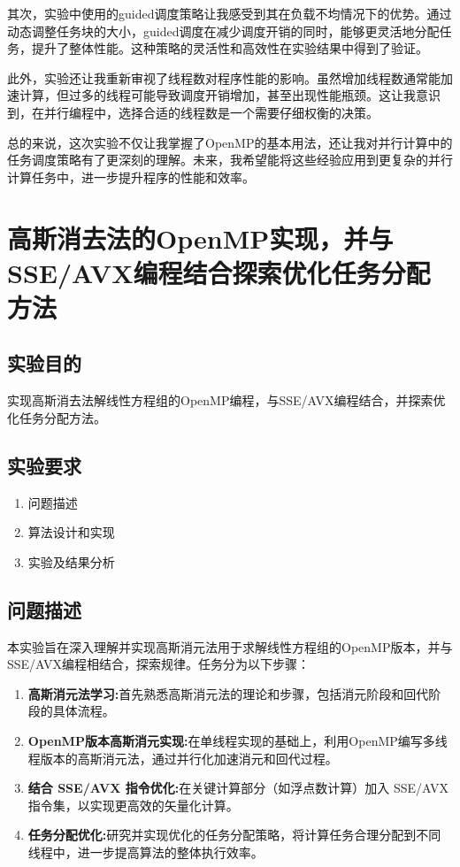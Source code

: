 \documentclass{nku}
\begin{document}
其次，实验中使用的guided调度策略让我感受到其在负载不均情况下的优势。通过动态调整任务块的大小，guided调度在减少调度开销的同时，能够更灵活地分配任务，提升了整体性能。这种策略的灵活性和高效性在实验结果中得到了验证。

此外，实验还让我重新审视了线程数对程序性能的影响。虽然增加线程数通常能加速计算，但过多的线程可能导致调度开销增加，甚至出现性能瓶颈。这让我意识到，在并行编程中，选择合适的线程数是一个需要仔细权衡的决策。

总的来说，这次实验不仅让我掌握了OpenMP的基本用法，还让我对并行计算中的任务调度策略有了更深刻的理解。未来，我希望能将这些经验应用到更复杂的并行计算任务中，进一步提升程序的性能和效率。

\section{高斯消去法的OpenMP实现，并与SSE/AVX编程结合探索优化任务分配方法}
\subsection{实验目的}
实现高斯消去法解线性方程组的OpenMP编程，与SSE/AVX编程结合，并探索优化任务分配方法。

\subsection{实验要求}
\begin{enumerate}
    \item 问题描述
    \item 算法设计和实现
    \item 实验及结果分析
\end{enumerate}

\subsection{问题描述}
本实验旨在深入理解并实现高斯消元法用于求解线性方程组的OpenMP版本，并与SSE/AVX编程相结合，探索规律。任务分为以下步骤：
\begin{enumerate}
    \item \textbf{高斯消元法学习:}首先熟悉高斯消元法的理论和步骤，包括消元阶段和回代阶段的具体流程。
    \item \textbf{OpenMP版本高斯消元实现:}在单线程实现的基础上，利用OpenMP编写多线程版本的高斯消元法，通过并行化加速消元和回代过程。
    \item \textbf{结合 SSE/AVX 指令优化:}在关键计算部分（如浮点数计算）加入 SSE/AVX 指令集，以实现更高效的矢量化计算。
    \item \textbf{任务分配优化:}研究并实现优化的任务分配策略，将计算任务合理分配到不同线程中，进一步提高算法的整体执行效率。
\end{enumerate}
\end{document}
